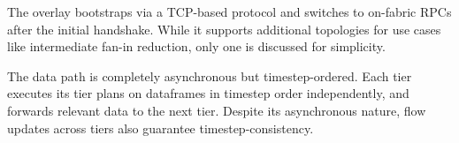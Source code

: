 The overlay bootstraps via a TCP-based protocol and switches to on-fabric RPCs after the initial
handshake.
While it supports additional topologies for use cases like intermediate fan-in reduction, only one
is discussed for simplicity.

The data path is completely asynchronous but timestep-ordered.
Each tier executes its tier plans on dataframes in timestep order independently, and forwards
relevant data to the next tier.
Despite its asynchronous nature, flow updates across tiers also guarantee timestep-consistency.



